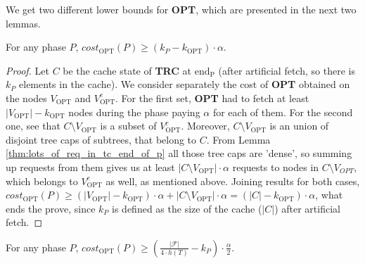 We get two different lower bounds for \textbf{OPT}, which are presented in the 
next two lemmas. 
\begin{lemma}
For any phase $P$, $cost_{\mathrm{OPT}}(P) \geq (k_P - k_{\mathrm{OPT}}) \cdot 
\alpha$.
\label{thm:opt_bound_with_k}
\end{lemma}
\begin{proof}
Let $C$ be the cache state of \textbf{TRC} at $\mathrm{end_P}$ (after 
artificial fetch, 
so there is $k_P$ elements in the cache). We consider separately the cost 
of \textbf{OPT} obtained on the nodes 
$V_{\mathrm{OPT}}$ and $V_{\mathrm{OPT}}^c$. For the first 
set, \textbf{OPT} had to fetch at least $|V_{\mathrm{OPT}}| - k_{\mathrm{OPT}}$ 
nodes during the 
phase paying $\alpha$ for each of them. For the second one, see that 
$C \setminus V_{\mathrm{OPT}}$ is a subset of $V_{\mathrm{OPT}}^c$. Moreover, 
$C \setminus 
V_{\mathrm{OPT}}$ is an union of disjoint tree caps of subtrees, that belong to 
$C$. From Lemma \ref{thm:lots_of_req_in_tc_end_of_p} all those tree caps are 
'dense', so summing up requests from them gives us at least 
$|C \setminus V_{\mathrm{OPT}}| \cdot 
\alpha$ requests to nodes in $C \setminus V_{OPT}$, which belongs to 
$V_{\mathrm{OPT}}^c$ as well, as mentioned above. Joining results for both 
cases, $cost_{\mathrm{OPT}}(P) \geq 
(|V_{\mathrm{OPT}}| - k_{\mathrm{OPT}}) \cdot \alpha + |C \setminus 
V_{\mathrm{OPT}}| \cdot 
\alpha = (|C| - k_{\mathrm{OPT}}) \cdot \alpha$, what ends the prove, since 
$k_P$ is defined as the size of the cache ($|C|$) after artificial fetch. 
\end{proof}
\begin{lemma}
For any phase $P$, $cost_{\mathrm{OPT}}(P) \geq (\frac{|\mathcal{F}|}{4 \cdot 
h(T)} 
-k_P) \cdot \frac{\alpha}{2}$.
\label{thm:opt_bound_with_F}
\end{lemma}
